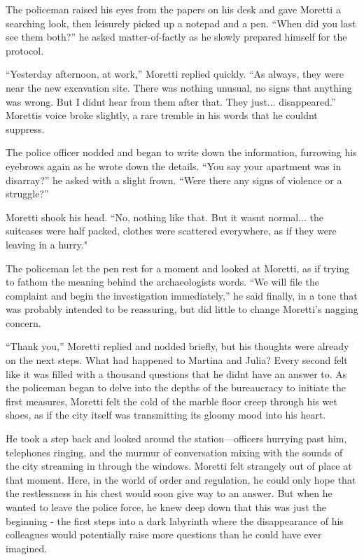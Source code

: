 \documentclass[
]{article}
\begin{document}
The policeman raised his eyes from the papers on his desk and gave
Moretti a searching look, then leisurely picked up a notepad and a pen.
``When did you last see them both?'' he asked matter-of-factly as he
slowly prepared himself for the protocol.

``Yesterday afternoon, at work,'' Moretti replied quickly. ``As always,
they were near the new excavation site. There was nothing unusual, no
signs that anything was wrong. But I didn\textquotesingle t hear from
them after that. They just... disappeared.'' Moretti\textquotesingle s
voice broke slightly, a rare tremble in his words that he
couldn\textquotesingle t suppress.

The police officer nodded and began to write down the information,
furrowing his eyebrows again as he wrote down the details. ``You say
your apartment was in disarray?'' he asked with a slight frown. ``Were
there any signs of violence or a struggle?''

Moretti shook his head. ``No, nothing like that. But it
wasn\textquotesingle t normal... the suitcases were half packed, clothes
were scattered everywhere, as if they were leaving in a hurry."

The policeman let the pen rest for a moment and looked at Moretti, as if
trying to fathom the meaning behind the archaeologist\textquotesingle s
words. ``We will file the complaint and begin the investigation
immediately,'' he said finally, in a tone that was probably intended to
be reassuring, but did little to change Moretti's nagging concern.

``Thank you,'' Moretti replied and nodded briefly, but his thoughts were
already on the next steps. What had happened to Martina and Julia? Every
second felt like it was filled with a thousand questions that he
didn\textquotesingle t have an answer to. As the policeman began to
delve into the depths of the bureaucracy to initiate the first measures,
Moretti felt the cold of the marble floor creep through his wet shoes,
as if the city itself was transmitting its gloomy mood into his heart.

He took a step back and looked around the station---officers hurrying
past him, telephones ringing, and the murmur of conversation mixing with
the sounds of the city streaming in through the windows. Moretti felt
strangely out of place at that moment. Here, in the world of order and
regulation, he could only hope that the restlessness in his chest would
soon give way to an answer. But when he wanted to leave the police
force, he knew deep down that this was just the beginning - the first
steps into a dark labyrinth where the disappearance of his colleagues
would potentially raise more questions than he could have ever imagined.
\end{document}
